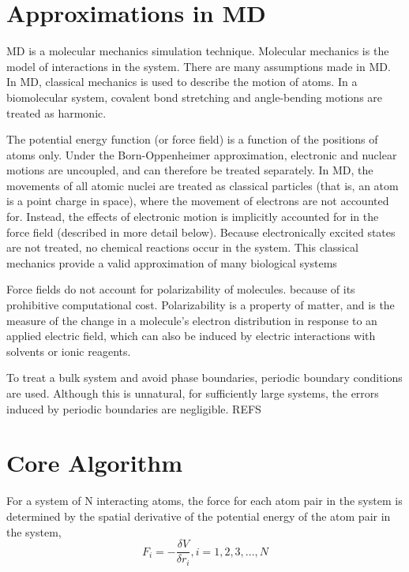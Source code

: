 \section{Approximations in MD}

MD is a molecular mechanics simulation technique.  Molecular mechanics is the model of interactions in the system. There are many assumptions made in MD.  In MD, classical mechanics is used to describe the motion of atoms.  In a biomolecular system, covalent bond stretching and angle-bending motions are treated as harmonic.

The potential energy function (or force field) is a function of the positions of atoms only.  Under the Born-Oppenheimer approximation, electronic and nuclear motions are uncoupled, and can therefore be treated separately.  
In MD, the movements of all atomic nuclei are treated as classical particles (that is, an atom is a point charge in space), where the movement of electrons are not accounted for. Instead, the effects of electronic motion is implicitly accounted for in the force field (described in more detail below). Because electronically excited states are not treated, no chemical reactions occur in the system. 
This classical mechanics provide a valid approximation of many biological systems %

Force fields do not account for polarizability of molecules.  because of its prohibitive computational cost.
Polarizability is a property of matter, and is the measure of the change in a molecule's electron distribution in response to an applied electric field, which can also be induced by electric interactions with solvents or ionic reagents. 

To treat a bulk system and avoid phase boundaries, periodic boundary conditions are used.  Although this is unnatural, for sufficiently large systems, the errors induced by periodic boundaries are negligible. REFS

\section{Core Algorithm}
For a system of N interacting atoms, the force for each atom pair in the system is determined by the spatial derivative of the potential energy of the atom pair in the system,
\begin{equation}
  F_i = - \frac{\delta V}{\delta r_i}, i = 1,2,3,..., N
\end{equation}

